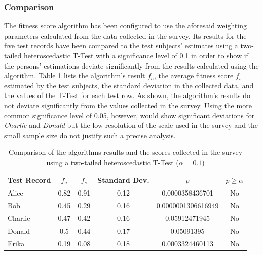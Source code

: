 \subsubsection{Comparison}
The fitness score algorithm has been configured to use the aforesaid weighting parameters calculated from the data collected in the survey. Its results for the five test records have been compared to the test subjects' estimates using a two-tailed heteroscedastic T-Test with a significance level of 0.1 in order to show if the persons' estimations deviate significantly from the results calculated using the algorithm. Table \ref{tab:survey_ttest} lists the algorithm's result $f_a$, the average fitness score $f_s$ estimated by the test subjects, the standard deviation in the collected data, and the values of the T-Test for each test row. As shown, the algorithm's results do not deviate significantly from the values collected in the survey. Using the more common significance level of 0.05, however, would show significant deviations for \textit{Charlie} and \textit{Donald} but the low resolution of the scale used in the survey and the small sample size do not justify such a precise analysis.

\begin{table}[htp]
\centering
\begin{tabular}{l||c||c|c||c|c}
Test Record & $f_a$ & $f_s$ & Standard Dev. & $p$ & $p \ge \alpha$\\
\hline
Alice       & 0.82 & 0.91 & 0.12 & 0.0000358436701 & No\\
Bob         & 0.45 & 0.29 & 0.16 & 0.0000001306616949 & No\\
Charlie     & 0.47 & 0.42 & 0.16 & 0.05912471945 & No\\
Donald      & 0.5  & 0.44 & 0.17 & 0.05091395 & No\\
Erika       & 0.19 & 0.08 & 0.18 & 0.0003324460113 & No\\
\end{tabular}
\caption[Survey: Comparison of Algorithm and Survey]{Comparison of the algorithms results and the scores collected in the survey using a two-tailed heteroscedastic T-Test ($\alpha = 0.1$) }
\label{tab:survey_ttest}
\end{table}

